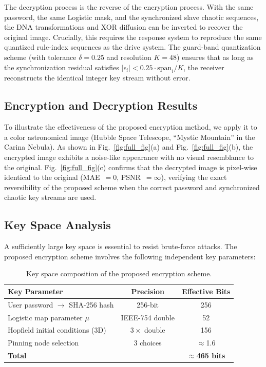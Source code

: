 \documentclass[a4paper,fleqn]{cas-sc}
\theoremstyle{plain}
\theoremstyle{definition}
\begin{document}
The decryption process is the reverse of the encryption process. With the same password, the same Logistic mask, and the synchronized slave chaotic sequences, the DNA transformations and XOR diffusion can be inverted to recover the original image. Crucially, this requires the response system to reproduce the same quantized rule-index sequences as the drive system. The guard-band quantization scheme (with tolerance $\delta = 0.25$ and resolution $K = 48$) ensures that as long as the synchronization residual satisfies $|\epsilon_i| < 0.25 \cdot \mathrm{span}_i / K$, the receiver reconstructs the identical integer key stream without error.

\subsection{Encryption and Decryption Results}

To illustrate the effectiveness of the proposed encryption method, we apply it to a color astronomical image (Hubble Space Telescope, ``Mystic Mountain'' in the Carina Nebula). As shown in Fig.~\ref{fig:full_fig}(a) and Fig.~\ref{fig:full_fig}(b), the encrypted image exhibits a noise-like appearance with no visual resemblance to the original. Fig.~\ref{fig:full_fig}(c) confirms that the decrypted image is pixel-wise identical to the original (MAE~$= 0$, PSNR~$= \infty$), verifying the exact reversibility of the proposed scheme when the correct password and synchronized chaotic key streams are used.

\subsection{Key Space Analysis}

A sufficiently large key space is essential to resist brute-force attacks. The proposed encryption scheme involves the following independent key parameters:

\begin{table}[htbp]
	\centering
	\caption{Key space composition of the proposed encryption scheme.}
	\label{tab:key_space}
	\begin{tabular}{lcc}
		\toprule
		\textbf{Key Parameter} & \textbf{Precision} & \textbf{Effective Bits} \\
		\midrule
		User password $\to$ SHA-256 hash & 256-bit & 256 \\
		Logistic map parameter $\mu$ & IEEE-754 double & 52 \\
		Hopfield initial conditions (3D) & $3 \times$ double & 156 \\
		Pinning node selection & 3 choices & $\approx$1.6 \\
		\midrule
		\textbf{Total} & & $\approx$\textbf{465 bits} \\
		\bottomrule
	\end{tabular}
\end{table}
\end{document}
